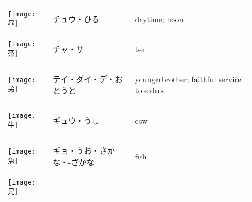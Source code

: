 \documentclass[a4paper,12pt]{extarticle}
\begin{document}
\begin{longtable}{|lp{6cm}p{4cm}|}
\begin{minipage}{0.3\textwidth}
\centerline{
	\texttt{[image: 昼]}
}
\end{minipage}
&
\begin{CJK}{UTF8}{min}チュウ・ひる\end{CJK}
&
daytime; noon
\\ 
\begin{minipage}{0.3\textwidth}
\centerline{
	\texttt{[image: 茶]}
}
\end{minipage}
&
\begin{CJK}{UTF8}{min}チャ・サ\end{CJK}
&
tea
\\ 
\begin{minipage}{0.3\textwidth}
\centerline{
	\texttt{[image: 弟]}
}
\end{minipage}
&
\begin{CJK}{UTF8}{min}テイ・ダイ・デ・おとうと\end{CJK}
&
youngerbrother; faithful service to elders
\\ 
\begin{minipage}{0.3\textwidth}
\centerline{
	\texttt{[image: 牛]}
}
\end{minipage}
&
\begin{CJK}{UTF8}{min}ギュウ・うし\end{CJK}
&
cow
\\ 
\begin{minipage}{0.3\textwidth}
\centerline{
	\texttt{[image: 魚]}
}
\end{minipage}
&
\begin{CJK}{UTF8}{min}ギョ・うお・さかな・-ざかな\end{CJK}
&
fish
\\ 
\begin{minipage}{0.3\textwidth}
\centerline{
	\texttt{[image: 兄]}
}
\end{minipage}
\end{longtable}
\end{document}
